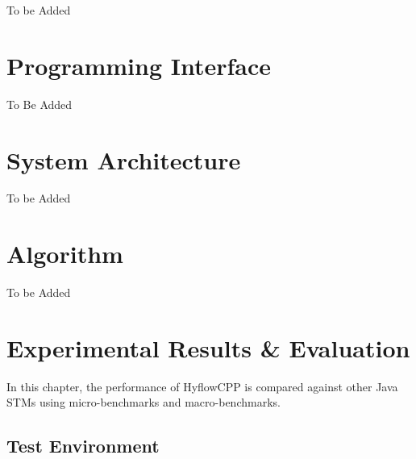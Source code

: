 \documentclass[12pt,english]{report}
\begin{document}
To be Added

\chapter{Programming Interface}\label{chap:progInterface}

To Be Added



\chapter{System Architecture}\label{chap:sysArch}

To be Added

\chapter{Algorithm}\label{chap:algorithm}

To be Added

\chapter{Experimental Results \& Evaluation}\label{chap:expResults}

In this chapter, the performance of HyflowCPP is compared against other Java STMs using micro-benchmarks and macro-benchmarks.

\section{Test Environment}
\end{document}
